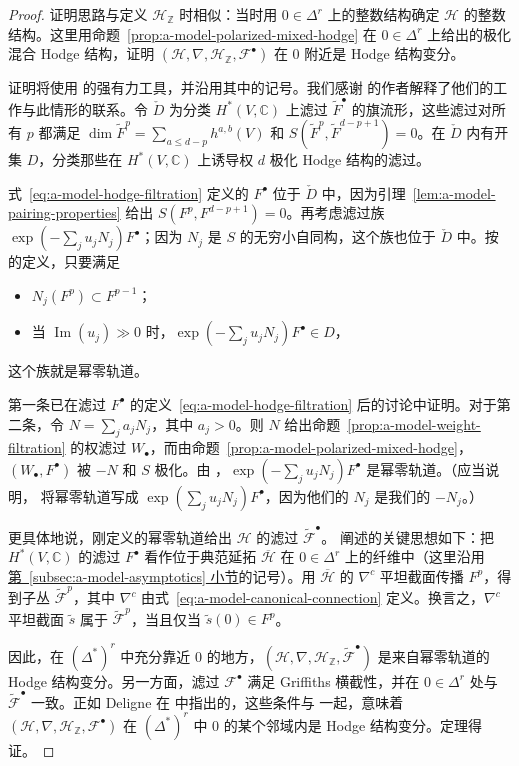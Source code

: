 \begin{proof}
证明思路与定义 $\mathcal H_{\mathbb Z}$ 时相似：当时用 $0\in\Delta^r$ 上的整数结构确定 $\mathcal H$ 的整数结构。这里用命题~\ref{prop:a-model-polarized-mixed-hodge} 在 $0\in\Delta^r$ 上给出的极化混合 Hodge 结构，证明 $(\mathcal H,\nabla,\mathcal H_{\mathbb Z},\mathcal F^\bullet)$ 在 $0$ 附近是 Hodge 结构变分。

证明将使用  的强有力工具，并沿用其中的记号。我们感谢  的作者解释了他们的工作与此情形的联系。令 $\check D$ 为分类 $H^*(V,\mathbb C)$ 上滤过 $\widetilde F^\bullet$ 的旗流形，这些滤过对所有 $p$ 都满足 $\dim\widetilde F^p=\sum_{a\le d-p}h^{a,b}(V)$ 和 $S(\widetilde F^p,\widetilde F^{d-p+1})=0$。在 $\check D$ 内有开集 $D$，分类那些在 $H^*(V,\mathbb C)$ 上诱导权 $d$ 极化 Hodge 结构的滤过。

式~\eqref{eq:a-model-hodge-filtration} 定义的 $F^\bullet$ 位于 $\check D$ 中，因为引理~\ref{lem:a-model-pairing-properties} 给出 $S(F^p,F^{d-p+1})=0$。再考虑滤过族 $\exp(-\sum_ju_jN_j)F^\bullet$；因为 $N_j$ 是 $S$ 的无穷小自同构，这个族也位于 $\check D$ 中。按  的定义，只要满足
\begin{itemize}
\item $N_j(F^p)\subset F^{p-1}$；
\item 当 $\operatorname{Im}(u_j)\gg0$ 时，$\exp(-\sum_ju_jN_j)F^\bullet\in D$，
\end{itemize}
这个族就是幂零轨道。

第一条已在滤过 $F^\bullet$ 的定义~\eqref{eq:a-model-hodge-filtration} 后的讨论中证明。对于第二条，令 $N=\sum_ja_jN_j$，其中 $a_j>0$。则 $N$ 给出命题~\ref{prop:a-model-weight-filtration} 的权滤过 $W_\bullet$，而由命题~\ref{prop:a-model-polarized-mixed-hodge}，$(W_\bullet,F^\bullet)$ 被 $-N$ 和 $S$ 极化。由 ，$\exp(-\sum_ju_jN_j)F^\bullet$ 是幂零轨道。（应当说明， 将幂零轨道写成 $\exp(\sum_ju_jN_j)F^\bullet$，因为他们的 $N_j$ 是我们的 $-N_j$。）

更具体地说，刚定义的幂零轨道给出 $\mathcal H$ 的滤过 $\widetilde{\mathcal F}^\bullet$。 阐述的关键思想如下：把 $H^*(V,\mathbb C)$ 的滤过 $F^\bullet$ 看作位于典范延拓 $\overline{\mathcal H}$ 在 $0\in\Delta^r$ 上的纤维中（这里沿用\hyperref[subsec:a-model-asymptotics]{第~\ref*{subsec:a-model-asymptotics} 小节}的记号）。用 $\overline{\mathcal H}$ 的 $\nabla^c$ 平坦截面传播 $F^p$，得到子丛 $\widetilde{\mathcal F}^p$，其中 $\nabla^c$ 由式~\eqref{eq:a-model-canonical-connection} 定义。换言之，$\nabla^c$ 平坦截面 $\widetilde s$ 属于 $\widetilde{\mathcal F}^p$，当且仅当 $\widetilde s(0)\in F^p$。

因此，在 $(\Delta^*)^r$ 中充分靠近 $0$ 的地方，$(\mathcal H,\nabla,\mathcal H_{\mathbb Z},\widetilde{\mathcal F}^\bullet)$ 是来自幂零轨道的 Hodge 结构变分。另一方面，滤过 $\mathcal F^\bullet$ 满足 Griffiths 横截性，并在 $0\in\Delta^r$ 处与 $\widetilde{\mathcal F}^\bullet$ 一致。正如 Deligne 在  中指出的，这些条件与  一起，意味着 $(\mathcal H,\nabla,\mathcal H_{\mathbb Z},\mathcal F^\bullet)$ 在 $(\Delta^*)^r$ 中 $0$ 的某个邻域内是 Hodge 结构变分。定理得证。
\end{proof}
